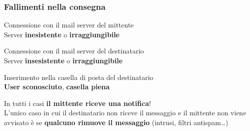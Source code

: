 \documentclass[10pt]{article}
\begin{document}
\subsubsection{Fallimenti nella consegna}
\begin{list}{}{Possibili problemi}
\item Connessione con il mail server del mittente\\Server \textbf{inesistente} o \textbf{irraggiungibile}
\item Connessione con il mail server del destinatario\\Server \textbf{insesistente} o \textbf{irraggiungibile}
\item Inserimento nella casella di posta del destinatario\\\textbf{User sconosciuto}, \textbf{casella piena}
\end{list}
In tutti i casi \textbf{il mittente riceve una notifica}!\\
L'unico caso in cui il destinatario non riceve il messaggio e il mittente non viene avvisato è se \textbf{qualcuno rimuove il messaggio} (intrusi, filtri antispam\ldots)
\end{document}
